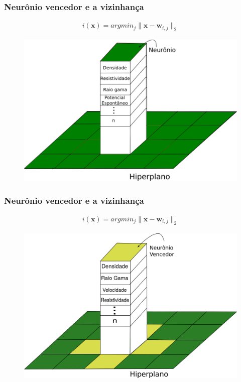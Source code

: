 \documentclass[aspectratio=10]{beamer} %
\begin{document}
\begin{frame}
	\frametitle{Neurônio vencedor e a vizinhança}	
	\begin{eqnarray}
	i(\textbf{x})= argmin_{j}  \parallel \textbf{x} - \textbf{w}_{i,j} \parallel_{2} \nonumber
	\end{eqnarray}
	\begin{figure}
		\centering
		\includegraphics[scale=0.33]{Imagens/hiperplano.png}
		\label{vencedor1}
	\end{figure}
\end{frame}

\begin{frame}
	\frametitle{Neurônio vencedor e a vizinhança}
	\begin{eqnarray}
	i(\textbf{x})= argmin_{j}  \parallel \textbf{x} - \textbf{w}_{i,j} \parallel_{2} \nonumber
	\end{eqnarray}
	\begin{figure}
		\centering
		\includegraphics[scale=0.33]{Imagens/winner.png}
		\label{vencedor2}
	\end{figure}
\end{frame}
\end{document}
